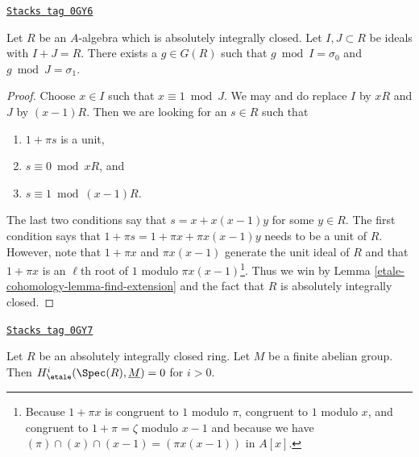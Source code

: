 \begin{lemma}[Interpolate]
\label{etale-cohomology-lemma-interpolate}
\href{https://stacks.math.columbia.edu/tag/0GY6}{\texttt{Stacks tag 0GY6}}

Let $R$ be an $A$-algebra which is absolutely integrally closed.
Let $I, J \subset R$ be ideals with $I + J = R$.
There exists a $g \in G(R)$ such
that $g \bmod I = \sigma_0$ and $g \bmod J = \sigma_1$.
\end{lemma}

\begin{proof}
Choose $x \in I$ such that $x \equiv 1 \bmod J$.
We may and do replace $I$ by $xR$ and $J$ by $(x - 1)R$.
Then we are looking for an $s \in R$ such that
\begin{enumerate}
\item $1 + \pi s$ is a unit,
\item $s \equiv 0 \bmod xR$, and
\item $s \equiv 1 \bmod (x - 1)R$.
\end{enumerate}
The last two conditions say that $s = x + x(x - 1)y$ for some $y \in R$.
The first condition says that $1 + \pi s = 1 + \pi x + \pi x (x - 1) y$
needs to be a unit of $R$.
However, note that $1 + \pi x$ and $\pi x (x - 1)$ generate the
unit ideal of $R$ and that $1 + \pi x$ is an $\ell$th root of $1$
modulo $\pi x (x - 1)$\footnote{Because $1 + \pi x$ is congruent
to $1$ modulo $\pi$, congruent to $1$ modulo $x$, and congruent to
$1 + \pi = \zeta$ modulo $x - 1$ and because we have
$(\pi) \cap (x) \cap (x - 1) = (\pi x (x - 1))$ in $A[x]$.}.
Thus we win by Lemma \ref{etale-cohomology-lemma-find-extension} and the
fact that $R$ is absolutely integrally closed.
\end{proof}

\begin{proposition}
\label{etale-cohomology-proposition-aic-vanishing}
\href{https://stacks.math.columbia.edu/tag/0GY7}{\texttt{Stacks tag 0GY7}}

Let $R$ be an absolutely integrally closed ring.
Let $M$ be a finite abelian group.
Then $H^i_\etale(\Spec(R), \underline{M}) = 0$ for $i > 0$.
\end{proposition}

